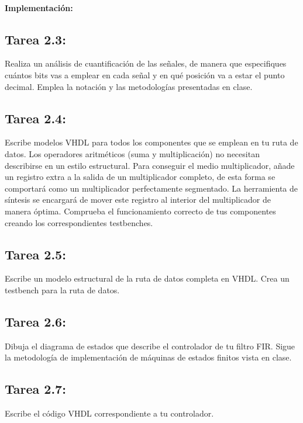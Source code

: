 \documentclass{article}
\begin{document}
\paragraph{Implementación:}

\subsection{Tarea 2.3:}

Realiza un análisis de cuantificación de las señales, de manera que especifiques cuántos bits vas a emplear en cada señal y en qué posición va a estar el punto decimal. Emplea la notación y las metodologías presentadas en clase.

\subsection{Tarea 2.4:}

Escribe modelos VHDL para todos los componentes que se emplean en tu ruta de datos. Los operadores aritméticos (suma y multiplicación) no necesitan describirse en un estilo estructural. Para conseguir el medio multiplicador, añade un registro extra a la salida de un multiplicador completo, de esta forma se comportará como un multiplicador perfectamente segmentado. La herramienta de síntesis se encargará de mover este registro al interior del multiplicador de manera óptima. Comprueba el funcionamiento correcto de tus componentes creando los correspondientes testbenches.

\subsection{Tarea 2.5:}
Escribe un modelo estructural de la ruta de datos completa en VHDL. Crea un testbench para la ruta de datos.

\subsection{Tarea 2.6:}

Dibuja el diagrama de estados que describe el controlador de tu filtro FIR. Sigue la metodología de implementación de máquinas de estados finitos vista en clase.

\subsection{Tarea 2.7:}

Escribe el código VHDL correspondiente a tu controlador.
\end{document}

